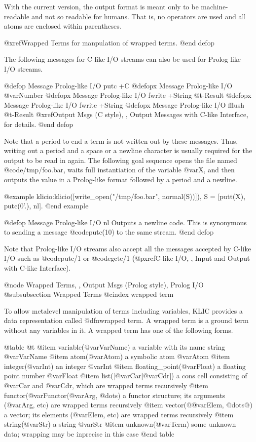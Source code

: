 {{{{With the current version, the output format is meant only to be
machine-readable and not so readable for humans.  That is, no operators
are used and all atoms are enclosed within parentheses.

@xref{Wrapped Terms} for manpulation of wrapped terms.
@end defop

The following messages for C-like I/O streams can also be used for
Prolog-like I/O streams.

@defop {Message} {Prolog-like I/O} putc +C
@defopx {Message} {Prolog-like I/O} @var{Number}
@defopx {Message} {Prolog-like I/O} fwrite +String @t{-}Result
@defopx {Message} {Prolog-like I/O} fwrite +String
@defopx {Message} {Prolog-like I/O} fflush @t{-}Result
@xref{Output Msgs (C style), , Output Messages with C-like Interface},
for details.
@end defop

Note that a period to end a term is not written out by these messages.
Thus, writing out a period and a space or a newline character is usually
required for the output to be read in again.  The following goal
sequence opens the file named @code{/tmp/foo.bar}, waits full
instantiation of the variable @var{X}, and then outputs the value in a
Prolog-like format followed by a period and a newline.

@example
klicio:klicio([write_open("/tmp/foo.bar", normal(S))]),
S = [putt(X), putc(0'.), nl].
@end example

@defop {Message} {Prolog-like I/O} nl
Outputs a newline code.  This is synonymous to sending a message
@code{putc(10)} to the same stream.
@end defop

Note that Prolog-like I/O streams also accept all the messages accepted
by C-like I/O such as @code{putc/1} or @code{getc/1} (@pxref{C-like
I/O, , Input and Output with C-like Interface}).

@node Wrapped Terms,  , Output Msgs (Prolog style), Prolog I/O
@subsubsection Wrapped Terms
@cindex wrapped term

To allow metalevel manipulation of terms including variables, KLIC
provides a data representation called @dfn{wrapped term}.  A wrapped
term is a ground term without any variables in it.  A wrapped term has
one of the following forms.

@table @t
@item variable(@var{VarName})
a variable with its name string @var{VarName}
@item atom(@var{Atom})
a symbolic atom @var{Atom}
@item integer(@var{Int})
an integer @var{Int}
@item floating_point(@var{Float})
a floating point number @var{Float}
@item list([@var{Car}|@var{Cdr}])
a cons cell consisting of @var{Car} and @var{Cdr}, which are wrapped
terms recursively
@item functor(@var{Functor}(@var{Arg}, @dots{})
a functor structure; its arguments (@var{Arg}, etc) are wrapped terms
recursively
@item vector(@{@var{Elem}, @dots{}@})
a vector; its elements (@var{Elem}, etc) are wrapped terms recursively
@item string(@var{Str})
a string @var{Str}
@item unknown(@var{Term})
some unknown data; wrapping may be inprecise in this case
@end table

}}}}
